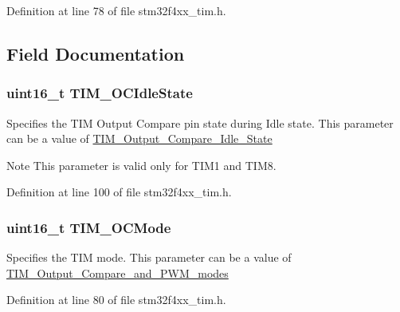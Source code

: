 Definition at line 78 of file stm32f4xx\-\_\-tim.\-h.



\subsection{Field Documentation}
\hypertarget{struct_t_i_m___o_c_init_type_def_afb328e9ef4de6eb9d78390d7366b9a6e}{
\subsubsection[{T\-I\-M\-\_\-\-O\-C\-Idle\-State}]{\setlength{\rightskip}{0pt plus 5cm}uint16\-\_\-t T\-I\-M\-\_\-\-O\-C\-Idle\-State}}\label{struct_t_i_m___o_c_init_type_def_afb328e9ef4de6eb9d78390d7366b9a6e}
Specifies the T\-I\-M Output Compare pin state during Idle state. This parameter can be a value of \hyperlink{group___t_i_m___output___compare___idle___state}{T\-I\-M\-\_\-\-Output\-\_\-\-Compare\-\_\-\-Idle\-\_\-\-State} \begin{DoxyNote}{Note}
This parameter is valid only for T\-I\-M1 and T\-I\-M8. 
\end{DoxyNote}


Definition at line 100 of file stm32f4xx\-\_\-tim.\-h.

\hypertarget{struct_t_i_m___o_c_init_type_def_afa69e616eb0b11bd238062dd8a5ceaa5}{
\subsubsection[{T\-I\-M\-\_\-\-O\-C\-Mode}]{\setlength{\rightskip}{0pt plus 5cm}uint16\-\_\-t T\-I\-M\-\_\-\-O\-C\-Mode}}\label{struct_t_i_m___o_c_init_type_def_afa69e616eb0b11bd238062dd8a5ceaa5}
Specifies the T\-I\-M mode. This parameter can be a value of \hyperlink{group___t_i_m___output___compare__and___p_w_m__modes}{T\-I\-M\-\_\-\-Output\-\_\-\-Compare\-\_\-and\-\_\-\-P\-W\-M\-\_\-modes} 

Definition at line 80 of file stm32f4xx\-\_\-tim.\-h.


